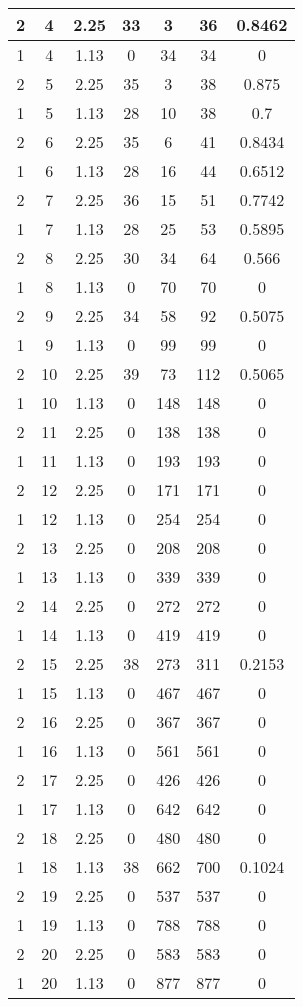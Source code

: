 \documentclass[letterpaper, 12pt]{article}
\begin{document}
\begin{longtable}{|c|c|c|c|c|c|c|}
\hline
2 & 4 & 2.25 & 33 & 3 & 36 & 0.8462 \\
\hline
1 & 4 & 1.13 & 0 & 34 & 34 & 0 \\
\hline
2 & 5 & 2.25 & 35 & 3 & 38 & 0.875 \\
\hline
1 & 5 & 1.13 & 28 & 10 & 38 & 0.7 \\
\hline
2 & 6 & 2.25 & 35 & 6 & 41 & 0.8434 \\
\hline
1 & 6 & 1.13 & 28 & 16 & 44 & 0.6512 \\
\hline
2 & 7 & 2.25 & 36 & 15 & 51 & 0.7742 \\
\hline
1 & 7 & 1.13 & 28 & 25 & 53 & 0.5895 \\
\hline
2 & 8 & 2.25 & 30 & 34 & 64 & 0.566 \\
\hline
1 & 8 & 1.13 & 0 & 70 & 70 & 0 \\
\hline
2 & 9 & 2.25 & 34 & 58 & 92 & 0.5075 \\
\hline
1 & 9 & 1.13 & 0 & 99 & 99 & 0 \\
\hline
2 & 10 & 2.25 & 39 & 73 & 112 & 0.5065 \\
\hline
1 & 10 & 1.13 & 0 & 148 & 148 & 0 \\
\hline
2 & 11 & 2.25 & 0 & 138 & 138 & 0 \\
\hline
1 & 11 & 1.13 & 0 & 193 & 193 & 0 \\
\hline
2 & 12 & 2.25 & 0 & 171 & 171 & 0 \\
\hline
1 & 12 & 1.13 & 0 & 254 & 254 & 0 \\
\hline
2 & 13 & 2.25 & 0 & 208 & 208 & 0 \\
\hline
1 & 13 & 1.13 & 0 & 339 & 339 & 0 \\
\hline
2 & 14 & 2.25 & 0 & 272 & 272 & 0 \\
\hline
1 & 14 & 1.13 & 0 & 419 & 419 & 0 \\
\hline
2 & 15 & 2.25 & 38 & 273 & 311 & 0.2153 \\
\hline
1 & 15 & 1.13 & 0 & 467 & 467 & 0 \\
\hline
2 & 16 & 2.25 & 0 & 367 & 367 & 0 \\
\hline
1 & 16 & 1.13 & 0 & 561 & 561 & 0 \\
\hline
2 & 17 & 2.25 & 0 & 426 & 426 & 0 \\
\hline
1 & 17 & 1.13 & 0 & 642 & 642 & 0 \\
\hline
2 & 18 & 2.25 & 0 & 480 & 480 & 0 \\
\hline
1 & 18 & 1.13 & 38 & 662 & 700 & 0.1024 \\
\hline
2 & 19 & 2.25 & 0 & 537 & 537 & 0 \\
\hline
1 & 19 & 1.13 & 0 & 788 & 788 & 0 \\
\hline
2 & 20 & 2.25 & 0 & 583 & 583 & 0 \\
\hline
1 & 20 & 1.13 & 0 & 877 & 877 & 0 \\
\hline
\end{longtable}
\end{document}
